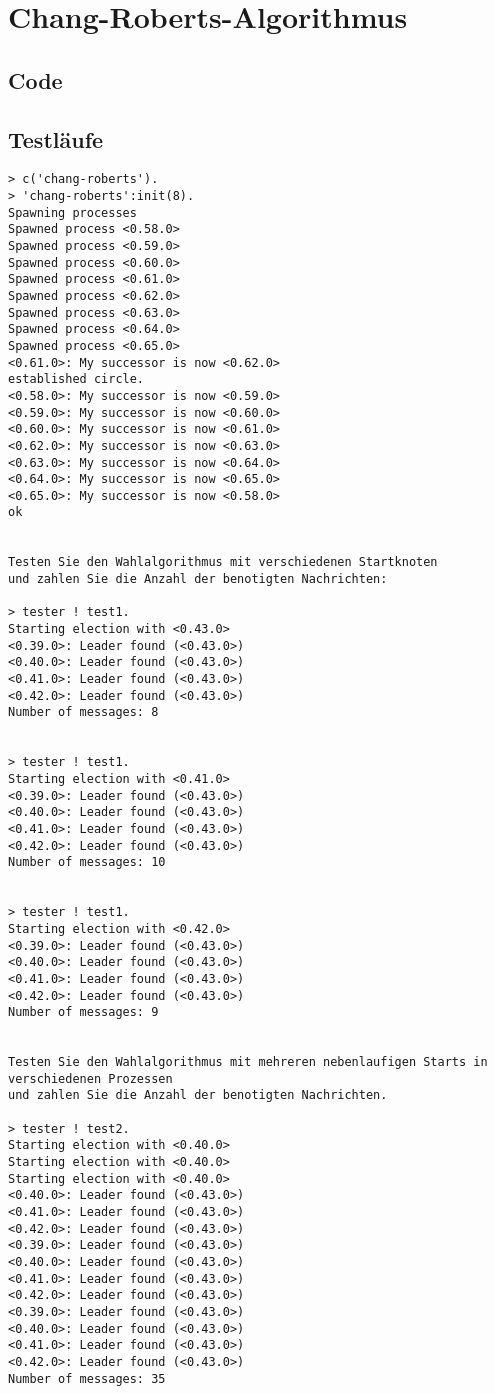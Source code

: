 \documentclass[a4paper,9pt]{article}
\begin{document}
\pagebreak{}
\section{Chang-Roberts-Algorithmus}
\subsection{Code}


\pagebreak{}
\subsection{Testläufe}

\begin{verbatim}
> c('chang-roberts').
> 'chang-roberts':init(8).
Spawning processes
Spawned process <0.58.0>
Spawned process <0.59.0>
Spawned process <0.60.0>
Spawned process <0.61.0>
Spawned process <0.62.0>
Spawned process <0.63.0>
Spawned process <0.64.0>
Spawned process <0.65.0>
<0.61.0>: My successor is now <0.62.0>
established circle.
<0.58.0>: My successor is now <0.59.0>
<0.59.0>: My successor is now <0.60.0>
<0.60.0>: My successor is now <0.61.0>
<0.62.0>: My successor is now <0.63.0>
<0.63.0>: My successor is now <0.64.0>
<0.64.0>: My successor is now <0.65.0>
<0.65.0>: My successor is now <0.58.0>
ok


Testen Sie den Wahlalgorithmus mit verschiedenen Startknoten
und zahlen Sie die Anzahl der benotigten Nachrichten:

> tester ! test1.
Starting election with <0.43.0>
<0.39.0>: Leader found (<0.43.0>)
<0.40.0>: Leader found (<0.43.0>)
<0.41.0>: Leader found (<0.43.0>)
<0.42.0>: Leader found (<0.43.0>)
Number of messages: 8


> tester ! test1.
Starting election with <0.41.0>
<0.39.0>: Leader found (<0.43.0>)
<0.40.0>: Leader found (<0.43.0>)
<0.41.0>: Leader found (<0.43.0>)
<0.42.0>: Leader found (<0.43.0>)
Number of messages: 10


> tester ! test1.
Starting election with <0.42.0>
<0.39.0>: Leader found (<0.43.0>)
<0.40.0>: Leader found (<0.43.0>)
<0.41.0>: Leader found (<0.43.0>)
<0.42.0>: Leader found (<0.43.0>)
Number of messages: 9


Testen Sie den Wahlalgorithmus mit mehreren nebenlaufigen Starts in verschiedenen Prozessen 
und zahlen Sie die Anzahl der benotigten Nachrichten.

> tester ! test2.
Starting election with <0.40.0>
Starting election with <0.40.0>
Starting election with <0.40.0>
<0.40.0>: Leader found (<0.43.0>)
<0.41.0>: Leader found (<0.43.0>)
<0.42.0>: Leader found (<0.43.0>)
<0.39.0>: Leader found (<0.43.0>)
<0.40.0>: Leader found (<0.43.0>)
<0.41.0>: Leader found (<0.43.0>)
<0.42.0>: Leader found (<0.43.0>)
<0.39.0>: Leader found (<0.43.0>)
<0.40.0>: Leader found (<0.43.0>)
<0.41.0>: Leader found (<0.43.0>)
<0.42.0>: Leader found (<0.43.0>)
Number of messages: 35
\end{verbatim}
\end{document}
